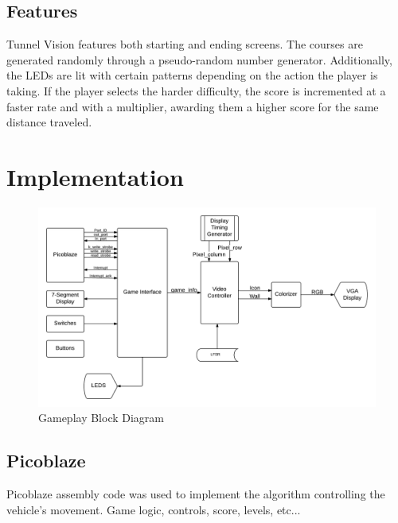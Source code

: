 \documentclass[11pt]{article}
\begin{document}
\subsection{Features}
Tunnel Vision features both starting and ending screens. The courses are generated randomly through a pseudo-random number generator. Additionally, the LEDs are lit with certain patterns depending on the action the player is taking. If the player selects the harder difficulty, the score is incremented at a faster rate and with a multiplier, awarding them a higher score for the same distance traveled.
	


\section{Implementation}

	\begin{figure}[h]\centering
	\includegraphics[height=0.7\textwidth, width=0.7\textheight]{Images/gameplay_diagram.png}
	\caption{Gameplay Block Diagram}
		\label{block_diagram}
	\end{figure}	
		
\subsection{Picoblaze}


		
		Picoblaze assembly code was used to implement the algorithm controlling the 
		vehicle's movement.
		Game logic, controls, score, levels, etc...
		
\end{document}
